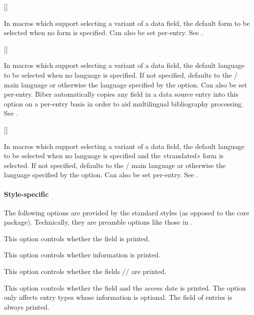 \documentclass{ltxdockit}[2011/03/25]
\newcommand*{\biber}{Biber\xspace}
\begin{document}
\begin{optionlist}
[\BiberOnly]

In macros which support selecting a variant of a data field, the default form to be selected when no form is specified. Can also be set per-entry. See . 

[\BiberOnly]

In macros which support selecting a variant of a data field, the default language to be selected when no language is specified. If not specified, defaults to the / main language or otherwise the language specified by the  option. Can also be set per-entry. \biber automatically copies any  field in a data source entry into this option on a per-entry basis in order to aid multilingual bibliography processing. See .

[\BiberOnly]

In macros which support selecting a variant of a data field, the default language to be selected when no language is specified and the «translated» form is selected. If not specified, defaults to the / main language or otherwise the language specified by the  option. Can also be set per-entry. See . 

\end{optionlist}

\paragraph{Style-specific}
\label{use:opt:pre:bbx}

The following options are provided by the standard styles (as opposed to the core package). Technically, they are preamble options like those in .

\begin{optionlist}


This option controls whether the field  is printed.


This option controls whether  information is printed.


This option controls whether the fields \slash {}\slash {} are printed.


This option controls whether the  field and the access date is printed. The option only affects entry types whose  information is optional. The  field of  entries is always printed.

\end{optionlist}
\end{document}

